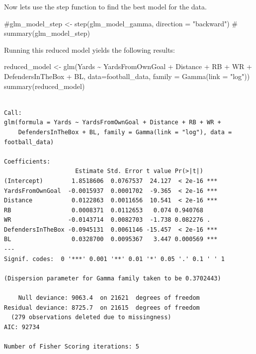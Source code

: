 \documentclass[
  super,
  preprint,
  3p]{elsarticle}
\newenvironment{Shaded}{\begin{snugshade}}{\end{snugshade}}
\newcommand{\AttributeTok}[1]{\textcolor[rgb]{0.40,0.45,0.13}{#1}}
\newcommand{\CommentTok}[1]{\textcolor[rgb]{0.37,0.37,0.37}{#1}}
\newcommand{\FunctionTok}[1]{\textcolor[rgb]{0.28,0.35,0.67}{#1}}
\newcommand{\NormalTok}[1]{\textcolor[rgb]{0.00,0.23,0.31}{#1}}
\newcommand{\OtherTok}[1]{\textcolor[rgb]{0.00,0.23,0.31}{#1}}
\newcommand{\SpecialCharTok}[1]{\textcolor[rgb]{0.37,0.37,0.37}{#1}}
\newcommand{\StringTok}[1]{\textcolor[rgb]{0.13,0.47,0.30}{#1}}
\begin{document}
Now lets use the step function to find the best model for the data.

\begin{Shaded}
\begin{Highlighting}[]
\CommentTok{\#glm\_model\_step \textless{}{-} step(glm\_model\_gamma, direction = "backward")}
\CommentTok{\# summary(glm\_model\_step)}
\end{Highlighting}
\end{Shaded}

Running this reduced model yields the following results:

\begin{Shaded}
\begin{Highlighting}[]
\NormalTok{reduced\_model }\OtherTok{\textless{}{-}} \FunctionTok{glm}\NormalTok{(Yards }\SpecialCharTok{\textasciitilde{}}\NormalTok{ YardsFromOwnGoal }\SpecialCharTok{+}\NormalTok{ Distance }\SpecialCharTok{+}\NormalTok{ RB }\SpecialCharTok{+}\NormalTok{ WR }\SpecialCharTok{+}\NormalTok{ DefendersInTheBox }\SpecialCharTok{+}\NormalTok{ BL, }\AttributeTok{data=}\NormalTok{football\_data, }\AttributeTok{family =} \FunctionTok{Gamma}\NormalTok{(}\AttributeTok{link =} \StringTok{"log"}\NormalTok{))}
\FunctionTok{summary}\NormalTok{(reduced\_model)}
\end{Highlighting}
\end{Shaded}

\begin{verbatim}

Call:
glm(formula = Yards ~ YardsFromOwnGoal + Distance + RB + WR + 
    DefendersInTheBox + BL, family = Gamma(link = "log"), data = football_data)

Coefficients:
                    Estimate Std. Error t value Pr(>|t|)    
(Intercept)        1.8518606  0.0767537  24.127  < 2e-16 ***
YardsFromOwnGoal  -0.0015937  0.0001702  -9.365  < 2e-16 ***
Distance           0.0122863  0.0011656  10.541  < 2e-16 ***
RB                 0.0008371  0.0112653   0.074 0.940768    
WR                -0.0143714  0.0082703  -1.738 0.082276 .  
DefendersInTheBox -0.0945131  0.0061146 -15.457  < 2e-16 ***
BL                 0.0328700  0.0095367   3.447 0.000569 ***
---
Signif. codes:  0 '***' 0.001 '**' 0.01 '*' 0.05 '.' 0.1 ' ' 1

(Dispersion parameter for Gamma family taken to be 0.3702443)

    Null deviance: 9063.4  on 21621  degrees of freedom
Residual deviance: 8725.7  on 21615  degrees of freedom
  (279 observations deleted due to missingness)
AIC: 92734

Number of Fisher Scoring iterations: 5
\end{verbatim}
\end{document}
